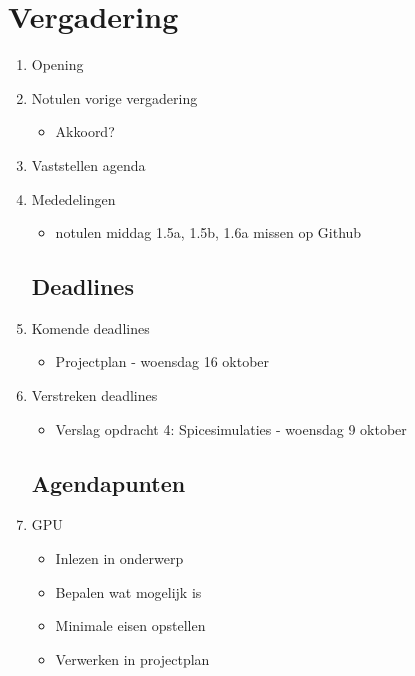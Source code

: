 \documentclass{article}
\begin{document}
\section*{Vergadering}
\begin{enumerate}
	
	\subsection*{Vooraf}
	\item Opening
	\item Notulen vorige vergadering
	\begin{itemize}
		\item Akkoord?
	\end{itemize}
	\item Vaststellen agenda
	\item Mededelingen
	\begin{itemize}
		\item notulen middag 1.5a, 1.5b, 1.6a missen op Github
	\end{itemize}

	\subsection*{Deadlines}
	\item Komende deadlines
	\begin{itemize}
		\item Projectplan - woensdag 16 oktober
	\end{itemize}
	\item Verstreken deadlines
	\begin{itemize}
		\item Verslag opdracht 4: Spicesimulaties - woensdag 9 oktober
	\end{itemize}

	\subsection*{Agendapunten}
	
	\item GPU
	\begin{itemize}
		\item Inlezen in onderwerp
		\item Bepalen wat mogelijk is
		\item Minimale eisen opstellen
		\item Verwerken in projectplan
	\end{itemize}


\end{enumerate}
\end{document}
